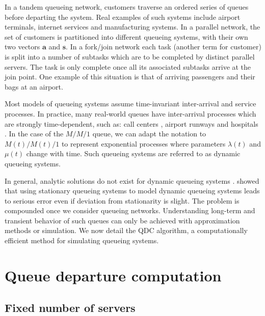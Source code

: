 \documentclass[article]{jss}
\begin{document}
In a tandem queueing network, customers traverse an ordered series of
queues before departing the system. Real examples of such systems
include airport terminals, internet services and manufacturing
systems. In a parallel network, the set of customers is partitioned into
different queueing systems, with their own two vectors $\mathbf{a}$ and $\mathbf{s}$.
In a fork/join network each task (another term for customer) is split into
a number of subtasks which are to be completed by distinct parallel
servers. The task is only complete once all its associated subtasks arrive
at the join point. One example of this situation is that of arriving passengers
and their bags at an airport.

Most models of queueing systems assume time-invariant inter-arrival
and service processes. In practice, many real-world queues have
inter-arrival processes which are strongly time-dependent, such as:
call centers \citep{weinberg2007bayesian, brown2005statistical},
airport runways \citep{koopman1972air} and hospitals
\citep{brahimi_queueing_1991}. In the case of the $M/M/1$ queue, we
can adapt the notation to $M(t)/M(t)/1$ to represent exponential
processes where parameters $\lambda(t)$ and $\mu(t)$ change with
time. Such queueing systems are referred to as dynamic queueing
systems.

In general, analytic solutions do not exist for dynamic queueing
systems \citep{malone1995dynamic,
  worthington2009reflections}. \citet{green1991some} showed that using
stationary queueing systems to model dynamic queueing systems leads to
serious error even if deviation from stationarity is slight. The
problem is compounded once we consider queueing
networks. Understanding long-term and transient behavior of such
queues can only be achieved with approximation methods or
simulation. We now detail the QDC algorithm, a computationally
efficient method for simulating queueing systems.

\section{Queue departure computation} \label{sec:QDC}

\subsection{Fixed number of servers}
\end{document}
